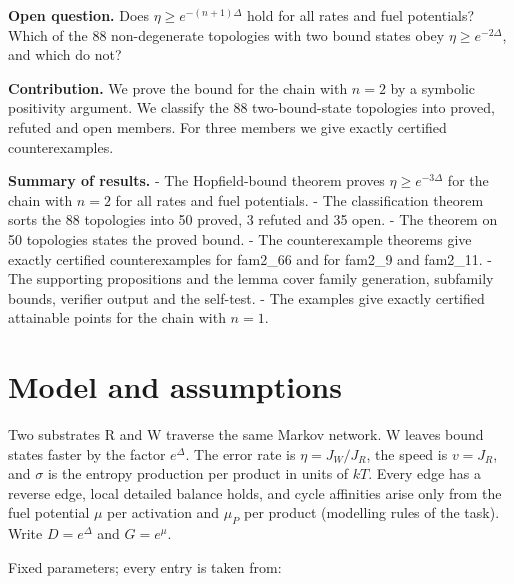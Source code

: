 \documentclass[11pt]{article}
\theoremstyle{definition}\newtheorem{definition}[theorem]{Definition}\newtheorem{example}[theorem]{Example}
\begin{document}
\textbf{Open question.} Does \(\eta\ge e^{-(n+1)\Delta}\) hold for all rates and fuel potentials? Which of the 88 non-degenerate topologies with two bound states obey \(\eta\ge e^{-2\Delta}\), and which do not?

\textbf{Contribution.} We prove the bound for the chain with \(n=2\) by a symbolic positivity argument. We classify the 88 two-bound-state topologies into proved, refuted and open members. For three members we give exactly certified counterexamples.

\textbf{Summary of results.}
- The Hopfield-bound theorem proves \(\eta\ge e^{-3\Delta}\) for the chain with \(n=2\) for all rates and fuel potentials.
- The classification theorem sorts the 88 topologies into 50 proved, 3 refuted and 35 open.
- The theorem on 50 topologies states the proved bound.
- The counterexample theorems give exactly certified counterexamples for fam2\_66 and for fam2\_9 and fam2\_11.
- The supporting propositions and the lemma cover family generation, subfamily bounds, verifier output and the self-test.
- The examples give exactly certified attainable points for the chain with \(n=1\).

\section{Model and assumptions}\label{model-and-assumptions}

Two substrates R and W traverse the same Markov network. W leaves bound states faster by the factor \(e^{\Delta}\). The error rate is \(\eta=J_W/J_R\), the speed is \(v=J_R\), and \(\sigma\) is the entropy production per product in units of \(kT\). Every edge has a reverse edge, local detailed balance holds, and cycle affinities arise only from the fuel potential \(\mu\) per activation and \(\mu_P\) per product (modelling rules of the task). Write \(D=e^{\Delta}\) and \(G=e^{\mu}\).

Fixed parameters; every entry is taken from:
\end{document}
